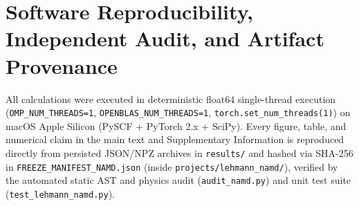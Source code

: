 \documentclass[10pt]{article}
\theoremstyle{natthm}
\begin{document}
\section{Software Reproducibility, Independent Audit, and Artifact Provenance}

All calculations were executed in deterministic float64 single-thread execution (\texttt{OMP\_NUM\_THREADS=1}, \texttt{OPENBLAS\_NUM\_THREADS=1}, \texttt{torch.set\_num\_threads(1)}) on macOS Apple Silicon (PySCF + PyTorch 2.x + SciPy).
Every figure, table, and numerical claim in the main text and Supplementary Information is reproduced directly from persisted JSON/NPZ archives in \texttt{results/} and hashed via SHA-256 in \texttt{FREEZE\_MANIFEST\_NAMD.json} (inside \texttt{projects/lehmann\_namd/}), verified by the automated static AST and physics audit (\texttt{audit\_namd.py}) and unit test suite (\texttt{test\_lehmann\_namd.py}).



\end{document}
